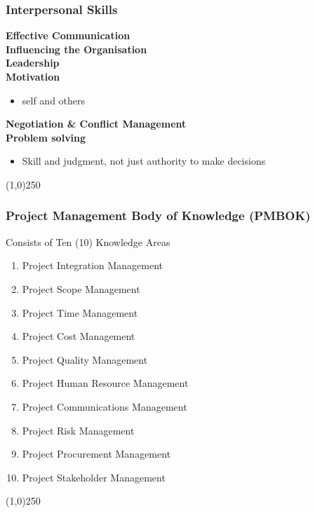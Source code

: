 \begin{frame}
\frametitle{Interpersonal Skills}
\textbf{Effective Communication}\\
\textbf{Influencing the Organisation}\\
\textbf{Leadership}\\
\textbf{Motivation}  \\
\begin{itemize}
	\item self and others
\end{itemize}
\textbf{Negotiation \& Conflict Management}\\
\textbf{Problem solving} \\
\begin{itemize}
	\item Skill and judgment, not just authority to make decisions 
\end{itemize}
\end{frame}
\begin{center}\line(1,0){250}\end{center}



\begin{frame}
\frametitle{Project Management Body of Knowledge (PMBOK\textregistered)}
Consists of Ten (10) Knowledge Areas
\begin{enumerate}
\item Project Integration Management
\item Project Scope Management
\item Project Time Management
\item Project Cost Management
\item Project Quality Management
\item Project Human Resource Management
\item Project Communications Management
\item Project Risk Management
\item Project Procurement Management
\item Project Stakeholder Management
\end{enumerate}
\end{frame}
\begin{center}\line(1,0){250}\end{center}



